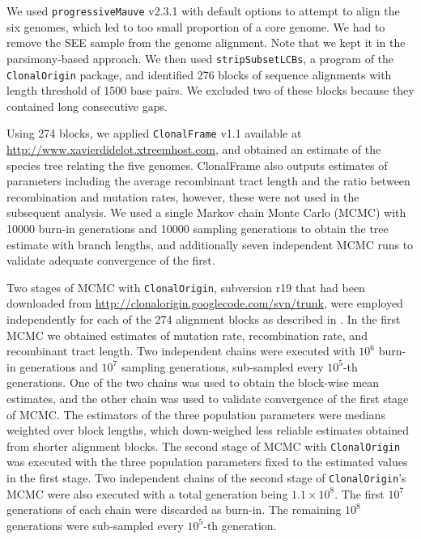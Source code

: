 \documentclass[english]{article}
\begin{document}
We used \texttt{progressiveMauve} v2.3.1 \citep{Darling2004,Darling2010} with
default options to attempt to align the six genomes, which led to too small
proportion of a core genome. We had to remove the SEE sample from the genome
alignment. Note that we kept it in the parsimony-based approach.  We then used
\texttt{stripSubsetLCBs}, a program of the \texttt{ClonalOrigin} package, and
identified 276 blocks of sequence alignments with length threshold of 1500 base
pairs.  We excluded two of these blocks because they contained long consecutive
gaps.

Using 274 blocks, we applied \texttt{ClonalFrame} v1.1 available at
\url{http://www.xavierdidelot.xtreemhost.com}, and obtained an estimate of the
species tree relating the five genomes. ClonalFrame also outputs estimates of
parameters including the average recombinant tract length and the ratio between
recombination and mutation rates, however, these were not used in the subsequent
analysis. We used a single Markov chain Monte Carlo (MCMC) with 10000 burn-in
generations and 10000 sampling generations to obtain the tree estimate with
branch lengths, and additionally seven independent MCMC runs to validate
adequate convergence of the first.

Two stages of MCMC with \texttt{ClonalOrigin}, subversion r19 that had been
downloaded from \url{http://clonalorigin.googlecode.com/svn/trunk}, were
employed independently for each of the 274 alignment blocks as described in
\citet{Didelot2010}.   In the first MCMC we obtained estimates of mutation rate,
recombination rate, and recombinant tract length.  Two independent chains were
executed with $10^6$ burn-in generations and $10^7$ sampling generations,
sub-sampled every $10^5$-th generations. One of the two chains was used to
obtain the block-wise mean estimates, and the other chain was used to validate
convergence of the first stage of MCMC.  The estimators of the three population
parameters were medians weighted over block lengths, which down-weighed less
reliable estimates obtained from shorter alignment blocks.  The second stage of
MCMC with \texttt{ClonalOrigin} was executed with the three population
parameters fixed to the estimated values in the first stage.  Two independent
chains of the second stage of \texttt{ClonalOrigin}'s MCMC were also executed
with a total generation being $1.1\times10^8$. The first $10^7$ generations of
each chain were discarded as burn-in. The remaining $10^8$ generations were
sub-sampled every $10^5$-th generation.  
\end{document}
